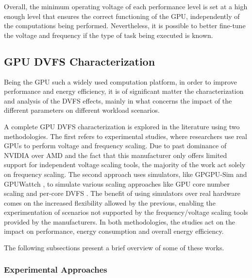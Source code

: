 Overall, the minimum operating voltage of each performance level is set at a high enough level that ensures the correct functioning of the GPU, independently of the computations being performed. Nevertheless, it is possible to better fine-tune the voltage and frequency if the type of task being executed is known.

\subsection{GPU DVFS Characterization}

Being the GPU such a widely used computation platform, in order to improve performance and energy efficiency, it is of significant matter the characterization and analysis of the DVFS effects, mainly in what concerns the impact of the different parameters on different workload scenarios. 

A complete GPU DVFS characterization is explored in the literature using two methodologies. The first refers to experimental studies, where researchers use real GPUs to perform voltage and frequency scaling. Due to past dominance of NVIDIA over AMD \cite{noauthor_jon_2018} \cite{mujtaba_amd_2019} and the fact that this manufacturer only offers limited support for independent voltage scaling tools, the majority of the work act solely on frequency scaling. The second approach uses simulators, like GPGPU-Sim \cite{noauthor_gpgpu-sim/gpgpu-sim_distribution_2019} and GPUWattch \cite{noauthor_gpu_2011} \cite{leng_gpuwattch:_2013},  to simulate various scaling approaches like GPU core number scaling and per-core DVFS \cite{mei_survey_2016}. The benefit of using simulators over real hardware comes on the increased flexibility allowed by the previous, enabling the experimentation of scenarios not supported by the frequency/voltage scaling tools provided by the manufacturers. In both methodologies, the studies act on the impact on performance, energy consumption and overall energy efficiency.

The following subsections present a brief overview of some of these works.

\subsubsection{Experimental Approaches}

